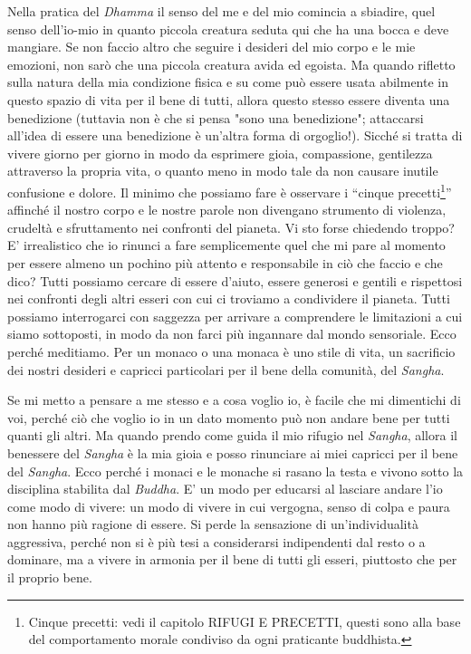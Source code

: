Nella pratica del \textit{Dhamma} il senso del me e del mio comincia a sbiadire,
quel senso dell'io-mio in quanto piccola creatura seduta qui che ha una
bocca e deve mangiare. Se non faccio altro che seguire i desideri del
mio corpo e le mie emozioni, non sarò che una piccola creatura avida ed
egoista. Ma quando rifletto sulla natura della mia condizione fisica e
su come può essere usata abilmente in questo spazio di vita per il bene
di tutti, allora questo stesso essere diventa una benedizione (tuttavia
non è che si pensa "sono una benedizione"; attaccarsi all'idea di essere
una benedizione è un'altra forma di orgoglio!). Sicché si tratta di
vivere giorno per giorno in modo da esprimere gioia, compassione,
gentilezza attraverso la propria vita, o quanto meno in modo tale da non
causare inutile confusione e dolore. Il minimo che possiamo fare è
osservare i “cinque precetti\footnote{Cinque precetti: vedi il capitolo RIFUGI E PRECETTI,
questi sono alla base del comportamento morale condiviso da ogni
praticante buddhista.}” affinché il nostro corpo e le
nostre parole non divengano strumento di violenza, crudeltà e
sfruttamento nei confronti del pianeta. Vi sto forse chiedendo troppo?
E' irrealistico che io rinunci a fare semplicemente quel che mi pare al
momento per essere almeno un pochino più attento e responsabile in ciò
che faccio e che dico? Tutti possiamo cercare di essere d'aiuto, essere
generosi e gentili e rispettosi nei confronti degli altri esseri con cui
ci troviamo a condividere il pianeta. Tutti possiamo interrogarci con
saggezza per arrivare a comprendere le limitazioni a cui siamo
sottoposti, in modo da non farci più ingannare dal mondo sensoriale.
Ecco perché meditiamo. Per un monaco o una monaca è uno stile di vita,
un sacrificio dei nostri desideri e capricci particolari per il bene
della comunità, del \textit{Sangha}.

Se mi metto a pensare a me stesso e a cosa voglio io, è facile che mi
dimentichi di voi, perché ciò che voglio io in un dato momento può non
andare bene per tutti quanti gli altri. Ma quando prendo come guida il
mio rifugio nel \textit{Sangha}, allora il benessere del \textit{Sangha} è la mia gioia e
posso rinunciare ai miei capricci per il bene del \textit{Sangha}. Ecco perché i
monaci e le monache si rasano la testa e vivono sotto la disciplina
stabilita dal \textit{Buddha}. E' un modo per educarsi al lasciare andare l'io
come modo di vivere: un modo di vivere in cui vergogna, senso di colpa e
paura non hanno più ragione di essere. Si perde la sensazione di
un'individualità aggressiva, perché non si è più tesi a considerarsi
indipendenti dal resto o a dominare, ma a vivere in armonia per il bene
di tutti gli esseri, piuttosto che per il proprio bene.

